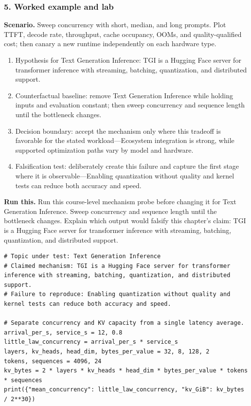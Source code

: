 \subsubsection*{5. Worked example and lab}
\textbf{Scenario.} Sweep concurrency with short, median, and long prompts. Plot TTFT, decode rate, throughput, cache occupancy, OOMs, and quality-qualified cost; then canary a new runtime independently on each hardware type.
\begin{enumerate}
\item Hypothesis for Text Generation Inference: TGI is a Hugging Face server for transformer inference with streaming, batching, quantization, and distributed support.
\item Counterfactual baseline: remove Text Generation Inference while holding inputs and evaluation constant; then sweep concurrency and sequence length until the bottleneck changes.
\item Decision boundary: accept the mechanism only where this tradeoff is favorable for the stated workload—Ecosystem integration is strong, while supported optimization paths vary by model and hardware.
\item Falsification test: deliberately create this failure and capture the first stage where it is observable—Enabling quantization without quality and kernel tests can reduce both accuracy and speed.
\end{enumerate}
\textbf{Run this.} Run this course-level mechanism probe before changing it for Text Generation Inference. Sweep concurrency and sequence length until the bottleneck changes. Explain which output would falsify this chapter's claim: TGI is a Hugging Face server for transformer inference with streaming, batching, quantization, and distributed support.
\begin{Verbatim}[fontsize=\scriptsize]
# Topic under test: Text Generation Inference
# Claimed mechanism: TGI is a Hugging Face server for transformer inference with streaming, batching, quantization, and distributed support.
# Failure to reproduce: Enabling quantization without quality and kernel tests can reduce both accuracy and speed.

# Separate concurrency and KV capacity from a single latency average.
arrival_per_s, service_s = 12, 0.8
little_law_concurrency = arrival_per_s * service_s
layers, kv_heads, head_dim, bytes_per_value = 32, 8, 128, 2
tokens, sequences = 4096, 24
kv_bytes = 2 * layers * kv_heads * head_dim * bytes_per_value * tokens * sequences
print({"mean_concurrency": little_law_concurrency, "kv_GiB": kv_bytes / 2**30})
\end{Verbatim}
